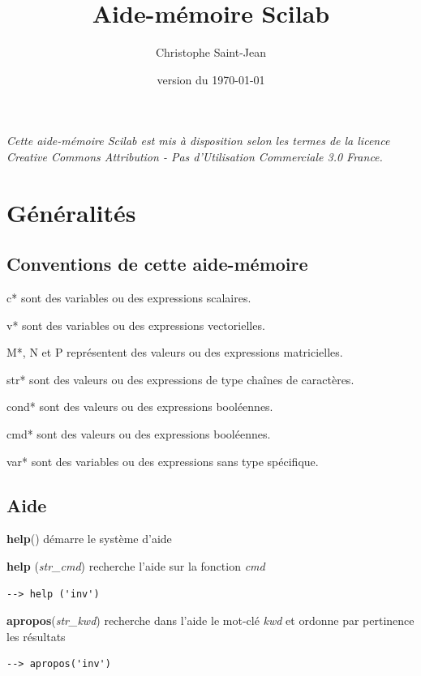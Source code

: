 \documentclass{article}
\title{\textbf{Aide-mémoire Scilab}}
\author{Christophe Saint-Jean}
\date{version du \today}
\begin{document}
\begin{multicols}{3}
\maketitle

\textit{Cette aide-mémoire Scilab est mis à disposition selon les termes de la licence Creative Commons Attribution - Pas d’Utilisation Commerciale 3.0 France. \ccby\ccnc\cc}
\section*{Généralités}
\subsection*{Conventions de cette aide-mémoire}
\begin{description}
\item{c*} sont des variables ou des expressions scalaires.
\item{v*} sont des variables ou des expressions vectorielles.
\item{M*, N et P} représentent des valeurs ou des expressions matricielles.
\item{str*} sont des valeurs ou des expressions de type chaînes de caractères.
\item{cond*} sont des valeurs ou des expressions booléennes.
\item{cmd*} sont des valeurs ou des expressions booléennes.
\item{var*} sont des variables ou des expressions sans type spécifique.
\end{description}
\subsection*{Aide}
\begin{description}
\item{\textbf{help}()} démarre le système d'aide
\item{\textbf{help} (\textit{str\_cmd})} recherche l'aide sur la fonction \textit{cmd}
       \begin{verbatim}--> help ('inv')\end{verbatim}
\item{\textbf{apropos}(\textit{str\_kwd})} recherche dans l'aide le mot-clé \textit{kwd} et ordonne par pertinence les résultats
       \begin{verbatim}--> apropos('inv')\end{verbatim}
\end{description}

\end{multicols}
\end{document}
